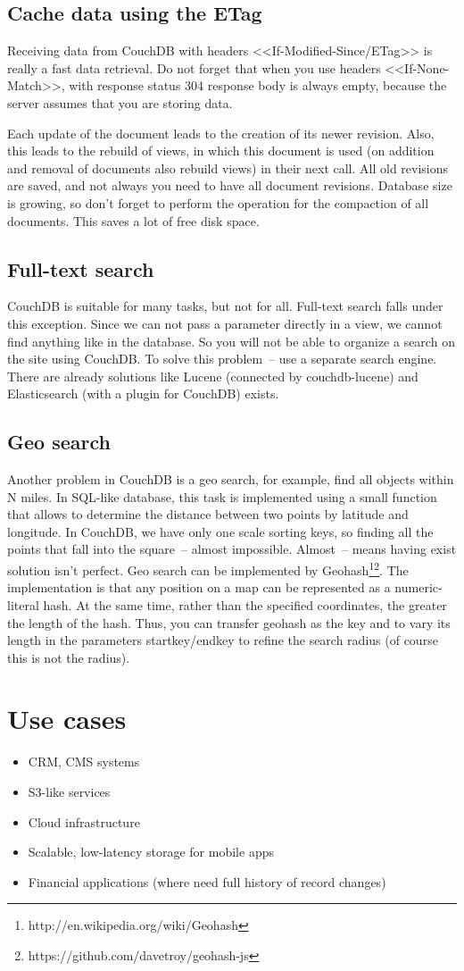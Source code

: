 \subsection{Cache data using the ETag}

Receiving data from CouchDB with headers <<If-Modified-Since/ETag>> is really a fast data retrieval. Do not forget that when you use headers <<If-None-Match>>, with response status 304 response body is always empty, because the server assumes that you are storing data.

Each update of the document leads to the creation of its newer revision. Also, this leads to the rebuild of views, in which this document is used (on addition and removal of documents also rebuild views) in their next call. All old revisions are saved, and not always you need to have all document revisions. Database size is growing, so don't forget to perform the operation for the compaction of all documents. This saves a lot of free disk space.

\subsection{Full-text search}

CouchDB is suitable for many tasks, but not for all. Full-text search falls under this exception. Since we can not pass a parameter directly in a view, we cannot find anything like in the database. So you will not be able to organize a search on the site using CouchDB. To solve this problem~-- use a separate search engine. There are already solutions like Lucene (connected by couchdb-lucene) and Elasticsearch (with a plugin for CouchDB) exists.

\subsection{Geo search}

Another problem in CouchDB is a geo search, for example, find all objects within N miles. In SQL-like database, this task is implemented using a small function that allows to determine the distance between two points by latitude and longitude. In CouchDB, we have only one scale sorting keys, so finding all the points that fall into the square~-- almost impossible. Almost~-- means having exist solution isn’t perfect. Geo search can be implemented by Geohash\footnote{http://en.wikipedia.org/wiki/Geohash}\footnote{https://github.com/davetroy/geohash-js}. The implementation is that any position on a map can be represented as a numeric-literal hash. At the same time, rather than the specified coordinates, the greater the length of the hash. Thus, you can transfer geohash as the key and to vary its length in the parameters startkey/endkey to refine the search radius (of course this is not the radius).


\section{Use cases}

\begin{itemize}
  \item CRM, CMS systems
  \item S3-like services
  \item Cloud infrastructure
  \item Scalable, low-latency storage for mobile apps
  \item Financial applications (where need full history of record changes)
\end{itemize}